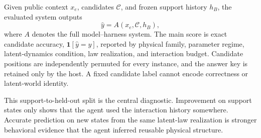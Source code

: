 Given public context $x_e$, candidates $\mathcal{C}$, and frozen support history $h_B$, the evaluated system outputs
\begin{equation}
  \hat{y} = A(x_e, \mathcal{C}, h_B),
  \label{eq:agent-objective}
\end{equation}
where $A$ denotes the full model--harness system. The main score is exact candidate accuracy, $\mathbf{1}[\hat{y}=y]$, reported by physical family, parameter regime, latent-dynamics condition, law realization, and interaction budget. Candidate positions are independently permuted for every instance, and the answer key is retained only by the host. A fixed candidate label cannot encode correctness or latent-world identity.

This support-to-held-out split is the central diagnostic. Improvement on support states only shows that the agent used the interaction history somewhere. Accurate prediction on new states from the same latent-law realization is stronger behavioral evidence that the agent inferred reusable physical structure.
